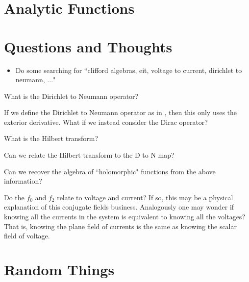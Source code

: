 \section{Analytic Functions}



\section{Questions and Thoughts}

\begin{itemize}
    \item Do some searching for ``clifford algebras, eit, voltage to current, dirichlet to neumann, ..."
\end{itemize}

\begin{question}
What is the Dirichlet to Neumann operator?
\end{question}

\begin{question}
If we define the Dirichlet to Neumann operator as in \cite{clay_d-to-n_map}, then this only uses the exterior derivative. What if we instead consider the Dirac operator?
\end{question}

\begin{question}
What is the Hilbert transform?
\end{question}

\begin{question}
Can we relate the Hilbert transform to the D to N map?
\end{question}

\begin{question}
Can we recover the algebra of ``holomorphic" functions from the above information?
\end{question}

\begin{question}
Do the $f_0$ and $f_2$ relate to voltage and current? If so, this may be a physical explanation of this conjugate fields business.  Analogously one may wonder if knowing all the currents in the system is equivalent to knowing all the voltages?  That is, knowing the plane field of currents is the same as knowing the scalar field of voltage.
\end{question}

\section{Random Things}


